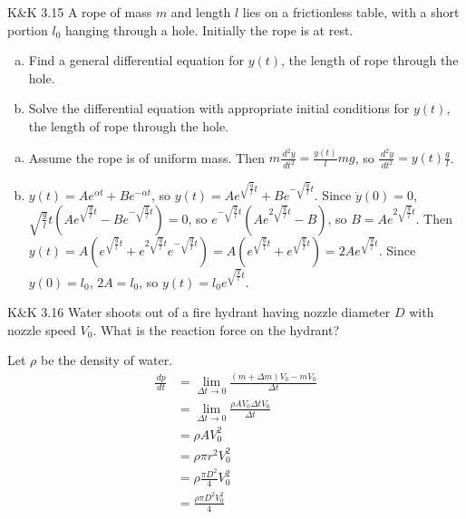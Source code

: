 \documentclass{esg8012pset}
\renewcommand{\d}{\,d}
\begin{document}
\begin{problem}{K\&K 3.15}
  A rope of mass $m$ and length $l$ lies on a frictionless table, with a short portion $l_0$ hanging through a hole. Initially the rope is at rest.
  \begin{enumerate}[(a)]
    \item Find a general differential equation for $y(t)$, the length of rope through the hole.
    \item Solve the differential equation with appropriate initial conditions for $y(t)$, the length of rope through the hole.
  \end{enumerate} 
\end{problem}
\begin{solution}
  \begin{enumerate}[(a)]
    \item Assume the rope is of uniform mass.  Then $m\frac{\d^2 y}{\d t^2} = \frac{y(t)}{l}m g$, so $\frac{\d^2 y}{\d t^2} = y(t)\frac{g}{l}$.
    \item $y(t) = Ae^{\alpha t} + Be^{-\alpha t}$, so $y(t) = Ae^{\sqrt{\frac{g}{l}}t}+Be^{-\sqrt{\frac{g}{l}}t}$.  Since $\dot y(0) = 0$, $\sqrt{\frac{g}{l}}t\left(Ae^{\sqrt{\frac{g}{l}}t}-Be^{-\sqrt{\frac{g}{l}}t}\right) = 0$, so $e^{-\sqrt{\frac{g}{l}}t}\left(Ae^{2\sqrt{\frac{g}{l}}t} - B\right)$, so $B = Ae^{2\sqrt{\frac{g}{l}}t}$.  Then $y(t) = A\left(e^{\sqrt{\frac{g}{l}}t}+e^{2\sqrt{\frac{g}{l}}t}e^{-\sqrt{\frac{g}{l}}t}\right) = A\left(e^{\sqrt{\frac{g}{l}}t}+e^{\sqrt{\frac{g}{l}}t}\right) = 2Ae^{\sqrt{\frac{g}{l}}t}$.  Since $y(0) = l_0$, $2A = l_0$, so $y(t) = l_0 e^{\sqrt{\frac{g}{l}}t}$.
  \end{enumerate} 
\end{solution}




\begin{problem}{K\&K 3.16}
  Water shoots out of a fire hydrant having nozzle diameter $D$ with nozzle speed $V_0$. What is the reaction force on the hydrant? 
\end{problem}
\begin{solution}
  Let $\rho$ be the density of water.
  \begin{align*}
   \frac{\d p}{\d t} & = \lim_{\Delta t \longrightarrow 0} \frac{(m + \Delta m)V_0 - m V_0}{\Delta t} \\
    & = \lim_{\Delta t \longrightarrow 0} \frac{\rho A V_0 \Delta t V_0}{\Delta t} \\
    & = \rho A V_0^2 \\
    & = \rho \pi r^2 V_0^2 \\
    & = \rho \frac{\pi D^2}{4} V_0^2 \\
    & = \frac{\rho \pi D^2 V_0^2}{4}
  \end{align*}
\end{solution}
\end{document}
